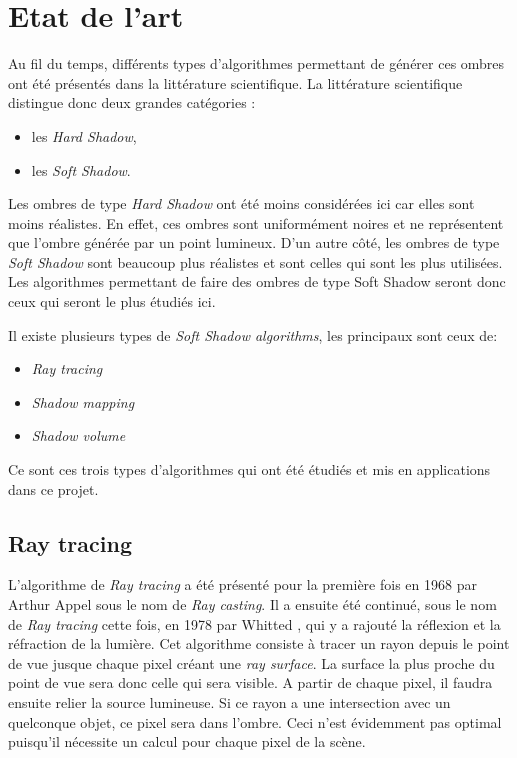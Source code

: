 \documentclass[a4paper,10pt]{report}
\begin{document}
\chapter{Etat de l'art}

Au fil du temps, différents types d'algorithmes permettant de générer ces ombres ont été présentés dans la littérature scientifique. La littérature scientifique distingue donc deux grandes catégories : 
\begin{itemize}
\item les \textit{Hard Shadow},
\item les \textit{Soft Shadow}.
\end{itemize}
Les ombres de type \textit{Hard Shadow} ont été moins considérées ici car elles sont moins réalistes. En effet, ces ombres sont uniformément noires et ne représentent que l'ombre générée par un point lumineux. D'un autre côté, les ombres de type \textit{Soft Shadow} sont beaucoup plus réalistes et sont celles qui sont les plus utilisées. Les algorithmes permettant de faire des ombres de type Soft Shadow seront donc ceux qui seront le plus étudiés ici.

Il existe plusieurs types de \textit{Soft Shadow algorithms}, les principaux sont ceux de:
\begin{itemize}
\item{\textit{Ray tracing}}
\item{\textit{Shadow mapping}}
\item{\textit{Shadow volume}}
\end{itemize}

Ce sont ces trois types d'algorithmes qui ont été étudiés et mis en applications dans ce projet.

\section{Ray tracing}


L'algorithme de \textit{Ray tracing} a été présenté pour la première fois en 1968 par Arthur Appel\cite{appel1968some} sous le nom de \textit{Ray casting}. Il a ensuite été continué, sous le nom de \textit{Ray tracing} cette fois, en 1978 par Whitted \cite{whitted1978scan}, qui y a rajouté la réflexion et la réfraction de la lumière. 
Cet algorithme consiste à tracer un rayon depuis le point de vue jusque chaque pixel créant une \textit{ray surface}. La surface la plus proche du point de vue sera donc celle qui sera visible. A partir de chaque pixel, il faudra ensuite relier la source lumineuse. Si ce rayon a une intersection avec un quelconque objet, ce pixel sera dans l'ombre. Ceci n'est évidemment pas optimal puisqu'il nécessite un calcul pour chaque pixel de la scène.
\end{document}
